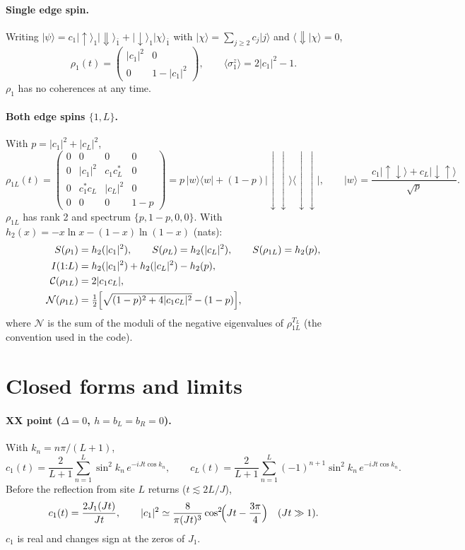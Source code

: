 \documentclass[11pt]{article}
\newcommand{\ket}[1]{\lvert #1\rangle}
\newcommand{\bra}[1]{\langle #1\rvert}
\newcommand{\up}{\uparrow}
\newcommand{\dn}{\downarrow}
\begin{document}
\paragraph{Single edge spin.}
Writing $\ket{\psi}=c_1\ket{\up}_1\ket{\Downarrow}_{\bar1}+\ket{\dn}_1\ket{\chi}_{\bar1}$ with $\ket{\chi}=\sum_{j\ge2}c_j\ket{j}$ and $\langle\Downarrow\vert\chi\rangle=0$,
\begin{equation}
\rho_1(t)=\begin{pmatrix}|c_1|^2&0\\0&1-|c_1|^2\end{pmatrix},\qquad
\langle\sigma^z_1\rangle=2|c_1|^2-1 .
\end{equation}
$\rho_1$ has no coherences at any time.

\paragraph{Both edge spins $\{1,L\}$.}
With $p=|c_1|^2+|c_L|^2$,
\begin{equation}
\rho_{1L}(t)=\begin{pmatrix}
0&0&0&0\\
0&|c_1|^2&c_1c_L^*&0\\
0&c_1^*c_L&|c_L|^2&0\\
0&0&0&1-p
\end{pmatrix}
= p\,\ket{w}\bra{w}+(1-p)\ket{\dn\dn}\bra{\dn\dn},\qquad
\ket{w}=\frac{c_1\ket{\up\dn}+c_L\ket{\dn\up}}{\sqrt p}.
\end{equation}
$\rho_{1L}$ has rank 2 and spectrum $\{p,1-p,0,0\}$. With $h_2(x)=-x\ln x-(1-x)\ln(1-x)$ (nats):
\begin{align}
S(\rho_1)&=h_2(|c_1|^2),\qquad S(\rho_L)=h_2(|c_L|^2),\qquad S(\rho_{1L})=h_2(p),\\
I(1{:}L)&=h_2(|c_1|^2)+h_2(|c_L|^2)-h_2(p),\\
\mathcal C(\rho_{1L})&=2|c_1c_L|,\\
\mathcal N(\rho_{1L})&=\tfrac12\Bigl[\sqrt{(1-p)^2+4|c_1c_L|^2}-(1-p)\Bigr],
\end{align}
where $\mathcal N$ is the sum of the moduli of the negative eigenvalues of $\rho_{1L}^{T_L}$ (the convention used in the code).

\section{Closed forms and limits}

\paragraph{XX point ($\Delta=0$, $h=b_L=b_R=0$).}
With $k_n=n\pi/(L+1)$,
\begin{equation}
c_1(t)=\frac{2}{L+1}\sum_{n=1}^{L}\sin^2k_n\,e^{-iJt\cos k_n},\qquad
c_L(t)=\frac{2}{L+1}\sum_{n=1}^{L}(-1)^{n+1}\sin^2k_n\,e^{-iJt\cos k_n}.
\end{equation}
Before the reflection from site $L$ returns ($t\lesssim 2L/J$),
\begin{equation}
c_1(t)=\frac{2J_1(Jt)}{Jt},\qquad |c_1|^2\simeq\frac{8}{\pi (Jt)^3}\cos^2\!\Bigl(Jt-\frac{3\pi}{4}\Bigr)\quad (Jt\gg1).
\end{equation}
$c_1$ is real and changes sign at the zeros of $J_1$.
\end{document}
